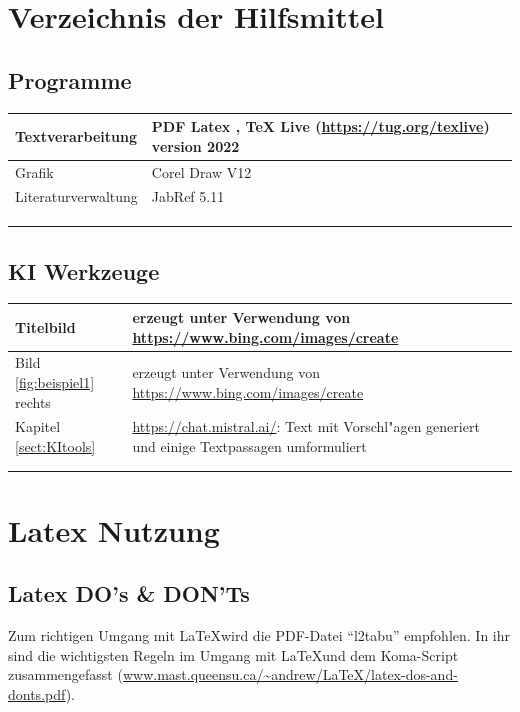 \chapter{Verzeichnis der Hilfsmittel}\label{sec:AnhangHilfsmittel}
\section{Programme}


\begin{tabular}{|p{4cm}|p{12cm}|}
	\hline 
Textverarbeitung	&  PDF Latex , TeX Live (\url{https://tug.org/texlive}) version 2022\\ 
	\hline 
Grafik	&  Corel Draw V12\\ 
	\hline 
Literaturverwaltung	& JabRef 5.11 \\ 
	\hline 
	&  \\ 
	\hline 
	&  \\ 
	\hline 
	&  \\ 
	\hline 
\end{tabular} 



\section{KI Werkzeuge}\label{sec:AnhangHilfsmittel_KI}
\begin{tabular}{|p{4cm}|p{12cm}|}
	\hline 
Titelbild	& erzeugt unter Verwendung von  \url{https://www.bing.com/images/create} \\ 
\hline 
Bild \ref{fig:beispiel1} rechts & erzeugt unter Verwendung von  \url{https://www.bing.com/images/create} \\ 
	\hline 
Kapitel \ref{sect:KItools}	& \url{https://chat.mistral.ai/}: Text mit Vorschl"agen generiert und einige Textpassagen umformuliert  \\ 
	\hline 
	&  \\ 
	\hline 
	&  \\ 
	\hline 
\end{tabular} 



\chapter{Latex Nutzung}
\section{Latex DO's \& DON'Ts}
						
Zum richtigen Umgang mit \LaTeX wird die PDF-Datei "`l2tabu"' empfohlen. In ihr sind die wichtigsten Regeln im Umgang mit \LaTeX und dem Koma-Script zusammengefasst (\url{www.mast.queensu.ca/~andrew/LaTeX/latex-dos-and-donts.pdf}).




